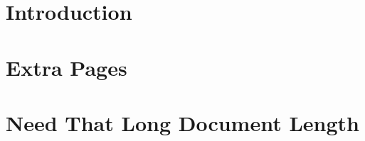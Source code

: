 \documentclass[showtrims]{memoir}
\begin{document}
\chapter{Introduction}

\lipsum[1-150]

\chapter{Extra Pages}

\lipsum[1-150]

\chapter{Need That Long Document Length}

\lipsum[1-150]
\end{document}
